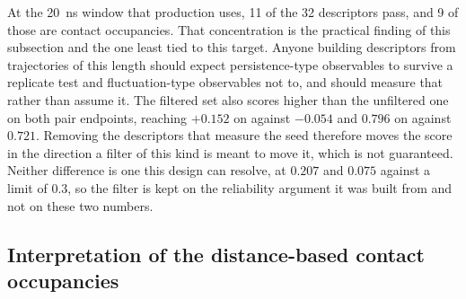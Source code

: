 At the \SI{20}{\nano\second} window that production uses, 11 of the 32 descriptors
pass, and 9 of those are contact occupancies. That concentration is the practical
finding of this subsection and the one least tied to this target. Anyone building
descriptors from trajectories of this length should expect persistence-type observables
to survive a replicate test and fluctuation-type observables not to, and should measure
that rather than assume it. The filtered set also scores higher than the unfiltered one on both pair endpoints,
reaching $+0.152$ on \framingB{} against $-0.054$ and $0.796$ on \framingC{} against
$0.721$. Removing the descriptors that measure the seed therefore moves the score in
the direction a filter of this kind is meant to move it, which is not guaranteed.
Neither difference is one this design can resolve, at $0.207$ and $0.075$ against a
limit of $0.3$, so the filter is kept on the reliability argument it was built from
and not on these two numbers.

\subsection{Interpretation of the distance-based contact occupancies}\label{sec:typed}


